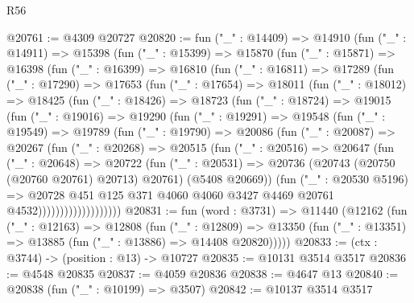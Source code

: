 \begin{lexlean}{R56}
\begin{coremodule}
@20761 := @4309 @20727
@20820 := fun ("_" : @14409) =>
  @14910
    (fun ("_" : @14911) =>
    @15398
      (fun ("_" : @15399) =>
      @15870
        (fun ("_" : @15871) =>
        @16398
          (fun ("_" : @16399) =>
          @16810
            (fun ("_" : @16811) =>
            @17289
              (fun ("_" : @17290) =>
              @17653
                (fun ("_" : @17654) =>
                @18011
                  (fun ("_" : @18012) =>
                  @18425
                    (fun ("_" : @18426) =>
                    @18723
                      (fun ("_" : @18724) =>
                      @19015
                        (fun ("_" : @19016) =>
                        @19290
                          (fun ("_" : @19291) =>
                          @19548
                            (fun ("_" : @19549) =>
                            @19789
                              (fun ("_" : @19790) =>
                              @20086
                                (fun ("_" : @20087) =>
                                @20267
                                  (fun ("_" : @20268) =>
                                  @20515
                                    (fun ("_" : @20516) =>
                                    @20647
                                      (fun ("_" : @20648) =>
                                      @20722
                                        (fun ("_" : @20531) =>
                                        @20736
                                          (@20743 (@20750 (@20760 @20761) @20713) @20761)
                                          (@5408 @20669))
                                        (fun ("_" : @20530 @5196) =>
                                        @20728
                                          @451
                                          @125
                                          @371
                                          @4060
                                          @4060
                                          @3427
                                          @4469
                                          @20761
                                          @4532)))))))))))))))))))
@20831 := fun (word : @3731) =>
  @11440
    (@12162
      (fun ("_" : @12163) =>
      @12808
        (fun ("_" : @12809) =>
        @13350 (fun ("_" : @13351) => @13885 (fun ("_" : @13886) => @14408 @20820)))))
@20833 := (ctx : @3744) -> (position : @13) -> @10727
@20835 := @10131 @3514 @3517
@20836 := @4548 @20835
@20837 := @4059 @20836
@20838 := @4647 @13
@20840 := @20838 (fun ("_" : @10199) => @3507)
@20842 := @10137 @3514 @3517

\end{coremodule}
\end{lexlean}
